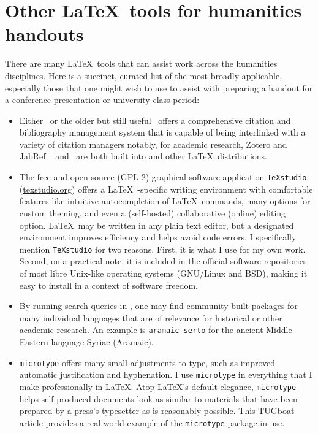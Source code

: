 \documentclass{ltugboat}
\begin{document}
\section{Other \LaTeX\ tools for humanities handouts}

There are many \LaTeX\ tools that can assist work across the humanities disciplines. Here is a succinct, curated list of the most broadly applicable, especially those that one might wish to use to assist with preparing a handout for a conference presentation or university class period:

\begin{itemize}
	\item Either \BibLaTeX\ or the older but still useful \BibTeX\ offers a comprehensive citation and bibliography management system that is capable of being interlinked with a variety of citation managers \Dash notably, for academic research, Zotero and JabRef.
		\subitem \BibLaTeX\ and \BibTeX\ are both built into  and other \LaTeX\ distributions.
	
	\item The free and open source (GPL-2) graphical software application \texttt{TeXstudio} (\url{texstudio.org}) offers a \LaTeX\ -specific writing environment with comfortable features like intuitive autocompletion of \LaTeX\ commands, many options for custom theming, and even a (self-hosted) collaborative (online) editing option.
		\subitem \LaTeX\ may be written in any plain text editor, but a designated environment improves efficiency and helps avoid code errors.
		\subitem I specifically mention \texttt{TeXstudio} for two reasons. First, it is what I use for my own work. Second, on a practical note, it is included in the official software repositories of most libre Unix-like operating systems (GNU/Linux and BSD), making it easy to install in a context of software freedom.
	
	\item By running search queries in \CTAN, one may find community-built packages for many individual languages that are of relevance for historical or other academic research.
		\subitem An example is \texttt{aramaic-serto} for the ancient Middle-Eastern language Syriac (Aramaic).
	
	\item \texttt{microtype} offers many small adjustments to type, such as improved automatic justification and hyphenation.
		\subitem I use \texttt{microtype} in everything that I make professionally in \LaTeX. Atop \LaTeX's default elegance, \texttt{microtype} helps self-produced documents look as similar to materials that have been prepared by a press's typesetter as is reasonably possible.
		\subitem This TUGboat article provides a real-world example of the \texttt{microtype} package in-use.
\end{itemize}





\makesignature
\end{document}
